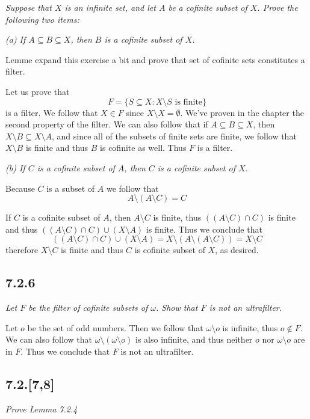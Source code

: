 \documentclass[11pt,oneside,titlepage]{book}
\newcommand{\set}[1]{\{ #1 \}}
\begin{document}
\textit{Suppose that $X$ is an infinite set, and let $A$ be a cofinite subset of $X$.
  Prove the following two items: }

\textit{(a) If $A \subseteq B \subseteq X$, then $B$ is a cofinite subset of $X$.}

Lemme expand this exercise a bit and prove that set of cofinite sets constitutes a filter.

Let us prove that
$$F = \set{S \subseteq X: X \setminus S\text{ is finite}}$$
is a filter. We follow that $X \in F$ since $X \setminus X = \emptyset$. We've proven in the
chapter the second property of the filter.
We can also follow that if $A \subseteq B \subseteq X$, then
$X \setminus B \subseteq X \setminus A$, and since all of the subsets of finite sets are finite,
we follow that $X \setminus B$ is finite and thus $B$ is cofinite as well. Thus $F$ is a filter.

\textit{(b) If $C$ is a cofinite subset of $A$, then $C$ is a cofinite subset of $X$.}

Because $C$ is a subset of $A$ we follow that
$$A \setminus (A \setminus C ) = C$$

If $C$ is a cofinite subset of $A$, then $A \setminus C$ is finite, thus
$((A \setminus C) \cap C)$ is finite and thus
$((A \setminus C) \cap C) \cup (X \setminus A)$ is finite. Thus we conclude that 
$$((A \setminus C) \cap C) \cup (X \setminus A)  = X \setminus (A \setminus (A \setminus C)) =
X \setminus C$$
therefore $X \setminus C$ is finite and thus $C$ is cofinite subset of $X$, as desired.

\subsection*{7.2.6}

\textit{Let $F$ be the filter of cofinite subsets of $\omega$. Show that $F$ is not
  an ultrafilter.}

Let $o$ be the set of odd numbers. Then we follow that $\omega \setminus o$ is infinite, thus
$o \notin F$. We can also follow that $\omega \setminus (\omega \setminus o)$
is also infinite, and thus neither $o$ nor $\omega \setminus o$ are in $F$. Thus we conclude that
$F$ is not an ultrafilter.

\subsection*{7.2.[7,8]}

\textit{Prove Lemma 7.2.4}
\end{document}
